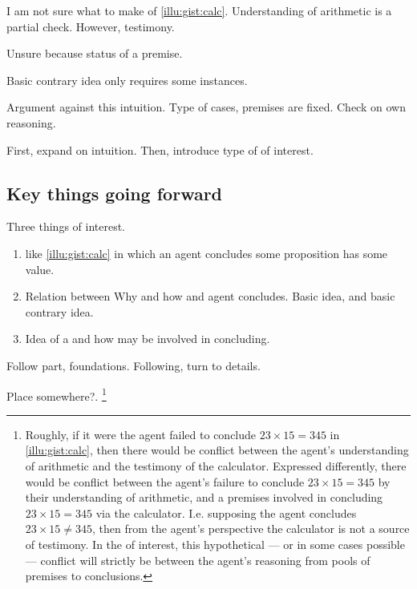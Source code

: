 \begin{note}
  I am not sure what to make of \ref{illu:gist:calc}.
  Understanding of arithmetic is a partial check.
  However, testimony.

  Unsure because status of a premise.

  Basic contrary idea only requires some instances.

  Argument against this intuition.
  Type of cases, premises are fixed.
  Check on own reasoning.

  First, expand on intuition.
  Then, introduce type of  of interest.
\end{note}

\subsection{Key things going forward}

\begin{note}
  Three things of interest.

  \begin{enumerate}
  \item
     like \autoref{illu:gist:calc} in which an agent concludes some proposition has some value.
  \item
    Relation between Why and how and agent concludes.
    Basic idea, and basic contrary idea.
  \item
    Idea of a \fc{} and how  may be involved in concluding.
  \end{enumerate}
\end{note}


\begin{note}
  Follow part, foundations.
  Following, turn to details.

{\color{red} Place somewhere?}.%
  \footnote{
    Roughly, if it were the agent failed to conclude \(23 \times 15 = 345\) in \autoref{illu:gist:calc}, then there would be conflict between the agent's understanding of arithmetic and the testimony of the calculator.
    Expressed differently, there would be conflict between the agent's failure to conclude \(23 \times 15 = 345\) by their understanding of arithmetic, and a premises involved in concluding \(23 \times 15 = 345\) via the calculator.
    I.e. supposing the agent concludes \(23 \times 15 \ne 345\), then from the agent's perspective the calculator is not a source of testimony.
    In the  of interest, this hypothetical --- or in some cases possible --- conflict will strictly be between the agent's reasoning from pools of premises to conclusions.
  }
\end{note}



